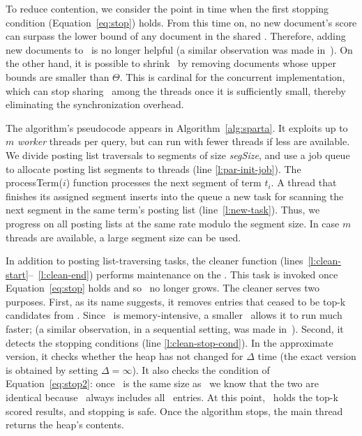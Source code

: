 To reduce contention, we 
consider the point in time when the first stopping condition (Equation~\ref{eq:stop}) holds. From this time on, no new document's score can surpass the lower bound of any document in the shared \DHeap. Therefore, adding new documents to \DMap\ is no longer helpful (a similar observation was made  in~\cite{Mamoulis:2007}). 
On the other hand, it is possible to shrink \DMap\ by removing documents whose upper bounds are smaller than $\Theta$.
This is cardinal for the concurrent implementation, which can stop sharing \DMap\ among the threads once it is sufficiently small, thereby eliminating the synchronization overhead. 





The algorithm's pseudocode appears in Algorithm~\ref{alg:sparta}. It 
exploits up to $m$ {\em worker\/} threads per query, but can run with fewer threads if less are available. 
We divide posting list traversals to segments of size \emph{segSize}, and use a job queue to allocate posting list segments to threads (line \ref{l:par-init-job}). 
The  {\sc processTerm($i$)} function processes the next segment of term $t_i$. 
A  thread that finishes its assigned segment inserts into the queue a new task for scanning the next segment in the same term's posting list 
(line~\ref{l:new-task}). Thus, we  progress on all posting lists at the same rate modulo the segment size. 
In case $m$ threads are available, a large segment size can be used.

In addition to  posting list-traversing tasks, the 
{\sc cleaner} function (lines~\ref{l:clean-start}--~\ref{l:clean-end}) performs maintenance on the \DMap.
This task is invoked once Equation~\ref{eq:stop} holds and so  \DMap\ no longer grows.
The cleaner serves two purposes. First, as its name suggests, it removes 
entries that ceased to be top-k candidates from \DMap. %
Since \alg\ is memory-intensive, a smaller \DMap\  allows it to run much faster; 
(a similar observation, in a sequential setting, was made in~\cite{Gursky:2008}). 
Second, it detects the stopping conditions (line \ref{l:clean-stop-cond}). In the approximate version, it checks whether the heap has not changed for $\Delta$ time 
(the exact version is obtained by setting $\Delta=\infty$). It also checks the  condition of Equation~\ref{eq:stop2}: 
once \DMap\ is the same size as \DHeap\ we know that the two are identical because \DMap\ always includes all \DHeap\ entries. 
At this point, \DHeap\ holds the top-k scored results, and stopping is safe. 
%
Once the algorithm stops, the main thread returns the heap's contents. 

